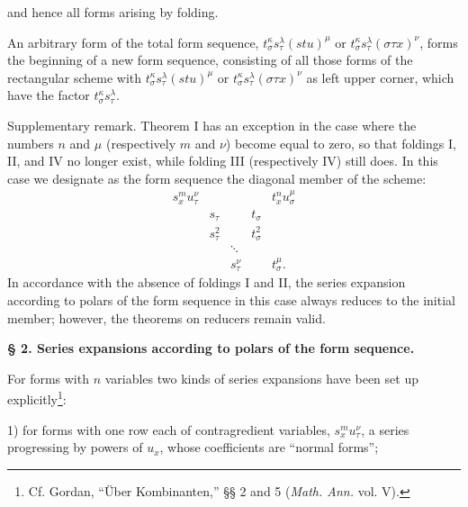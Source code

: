 \documentclass[11pt]{article}
\begin{document}
and hence all forms arising by folding.

An arbitrary form of the total form sequence, $t_\sigma^\kappa s_\tau^\lambda(stu)^\mu$ or $t_\sigma^\kappa s_\tau^\lambda(\sigma\tau x)^\nu$, forms the beginning of a new form sequence, consisting of all those forms of the rectangular scheme with $t_\sigma^\kappa s_\tau^\lambda(stu)^\mu$ or $t_\sigma^\kappa s_\tau^\lambda(\sigma\tau x)^\nu$ as left upper corner, which have the factor $t_\sigma^\kappa s_\tau^\lambda$.

Supplementary remark. Theorem I has an exception in the case where the numbers $n$ and $\mu$ (respectively $m$ and $\nu$) become equal to zero, so that foldings I, II, and IV no longer exist, while folding III (respectively IV) still does. In this case we designate as the form sequence the diagonal member of the scheme:
\[
\begin{array}{ccccc}
s_x^m u_\tau^\nu &&&& t_x^n u_\sigma^\mu\\
& s_\tau && t_\sigma &\\
& s_\tau^2 && t_\sigma^2 &\\
&&\ddots&&\\
&&s_\tau^\nu && t_\sigma^\mu .
\end{array}
\]
In accordance with the absence of foldings I and II, the series expansion according to polars of the form sequence in this case always reduces to the initial member; however, the theorems on reducers remain valid.

\begin{center}
\textbf{§ 2. \quad Series expansions according to polars of the form sequence.}
\end{center}

For forms with $n$ variables two kinds of series expansions have been set up explicitly\footnote{Cf. Gordan, ``Über Kombinanten,'' §§ 2 and 5 (\emph{Math. Ann.} vol. V).}:

1) for forms with one row each of contragredient variables, $s_x^m u_\tau^\nu$, a series progressing by powers of $u_x$, whose coefficients are ``normal forms'';
\end{document}
